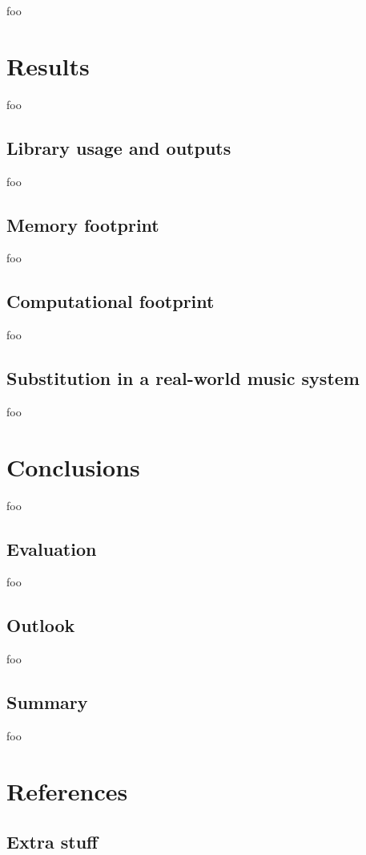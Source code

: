 \documentclass[letter,12pt,notitlepage]{article}
\begin{document}
foo

\vfill
\clearpage

\section{Results}
\label{sec:results}

foo

\subsection{Library usage and outputs}

foo

\subsection{Memory footprint}

foo

\subsection{Computational footprint}

foo

\subsection{Substitution in a real-world music system}

foo

\vfill
\clearpage

\section{Conclusions}
\label{sec:conclusion}

foo

\subsection{Evaluation}

foo

\subsection{Outlook}

foo

\subsection{Summary}

foo

\vfill
\clearpage %

\section{References}
\printbibliography[heading=none]

\vfill
\clearpage %

\begin{appendices}

\section{Extra stuff}
\label{appendix:rthpss}

\end{appendices}
\end{document}
